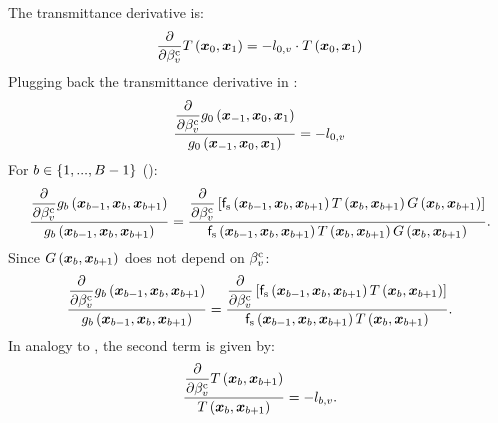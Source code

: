\documentclass{article}
\begin{document}
The transmittance derivative is:
\begin{equation}
\label{eq:trans_derivative}
\dfrac{\partial}{\partial {\beta^{\text{c}}_v}}T\left({{\boldsymbol{x}_{0}},{\boldsymbol{x}_{1}}}\right) = 
-l_{0, v} \cdot T\left({{\boldsymbol{x}_{0}},{\boldsymbol{x}_{1}}}\right)
\end{equation}
Plugging back the transmittance derivative in \eq{\ref{eq:Sm0}}:
\begin{equation}
\label{eq:trans_derivative2}
\frac{\dfrac{\partial}{\partial {\beta^{\text{c}}_v}}g_{0}\left({\boldsymbol{x}_{-1},\boldsymbol{x}_{0},\boldsymbol{x}_{1}}\right)}{g_{0}\left({\boldsymbol{x}_{-1},\boldsymbol{x}_{0},\boldsymbol{x}_{1}}\right)} = -l_{0, v}
\end{equation}
For $b\in\left\{ {1,...,B-1}\right\}$ (\eqnopar{\ref{eq:gk_scatter}}):
\begin{equation}
\frac{\dfrac{\partial}{\partial {\beta^{\text{c}}_v}}g_{b}\left({\boldsymbol{x}_{b-1},\boldsymbol{x}_{b},\boldsymbol{x}_{b+1}}\right)}{g_{b}\left({\boldsymbol{x}_{b-1},\boldsymbol{x}_{b},\boldsymbol{x}_{b+1}}\right)} = \frac{\dfrac{\partial}{\partial {\beta^{\text{c}}_v}}\left[{\mathsf{f}_{\text{s}}\left({\boldsymbol{x}_{b-1},\boldsymbol{x}_{b},\boldsymbol{x}_{b+1}}\right)T\left({{\boldsymbol{x}_{b}},{\boldsymbol{x}_{b+1}}}\right)G\left({\boldsymbol{x}_{b},\boldsymbol{x}_{b+1}}\right)}\right]}{\mathsf{f}_{\text{s}}\left({\boldsymbol{x}_{b-1},\boldsymbol{x}_{b},\boldsymbol{x}_{b+1}}\right)T\left({{\boldsymbol{x}_{b}},{\boldsymbol{x}_{b+1}}}\right)G\left({\boldsymbol{x}_{b},\boldsymbol{x}_{b+1}}\right)}.
\end{equation}
Since $G\left({\boldsymbol{x}_{b},\boldsymbol{x}_{b+1}}\right)$ does not depend on $\beta^{\text{c}}_{v}$:
\begin{equation}
\label{eq:gb_deriv}
\frac{\dfrac{\partial}{\partial {\beta^{\text{c}}_v}}g_{b}\left({\boldsymbol{x}_{b-1},\boldsymbol{x}_{b},\boldsymbol{x}_{b+1}}\right)}{g_{b}\left({\boldsymbol{x}_{b-1},\boldsymbol{x}_{b},\boldsymbol{x}_{b+1}}\right)} = \frac{\dfrac{\partial}{\partial {\beta^{\text{c}}_v}}\left[{\mathsf{f}_{\text{s}}\left({\boldsymbol{x}_{b-1},\boldsymbol{x}_{b},\boldsymbol{x}_{b+1}}\right)T\left({{\boldsymbol{x}_{b}},{\boldsymbol{x}_{b+1}}}\right)}\right]}{\mathsf{f}_{\text{s}}\left({\boldsymbol{x}_{b-1},\boldsymbol{x}_{b},\boldsymbol{x}_{b+1}}\right)T\left({{\boldsymbol{x}_{b}},{\boldsymbol{x}_{b+1}}}\right)}.
\end{equation}
In analogy to \eqs{\ref{eq:trans_derivative},\ref{eq:trans_derivative2}}, the second term is given by:
\begin{equation}
\label{eq:trans_deriv_b}
\frac{\dfrac{\partial}{\partial {\beta^{\text{c}}_v}}T\left({{\boldsymbol{x}_{b}},{\boldsymbol{x}_{b+1}}}\right)}{T\left({{\boldsymbol{x}_{b}},{\boldsymbol{x}_{b+1}}}\right)} = 
-l_{b, v}.
\end{equation}
\end{document}
